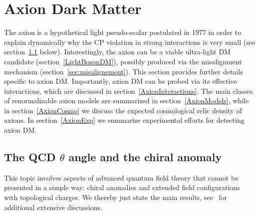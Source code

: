 \section{Axion Dark Matter}
\label{axion}
The axion is a hypothetical light pseudo-scalar postulated in 1977 in order to explain dynamically why the CP violation
in strong interactions is very small (see section~\ref{AxionQCD} below).
Interestingly, the axion can be a viable ultra-light  DM candidate (section~\ref{LightBosonDM}),
possibly produced via the misalignment mechanism (section~\ref{sec:misalignement}). This section provides further details specific to axion DM.
Importantly, axion DM can be probed via its effective interactions, which are discussed in section~\ref{AxionInteractions}.
The main classes of renormalizable axion models are summarized in section~\ref{AxionModels}, while
in section~\ref{AxionCosmo} we discuss the expected cosmological relic density of axions.
In section~\ref{AxionExp} we summarize experimental efforts for detecting axion DM.





\subsection{The QCD $\theta$ angle and the chiral anomaly}\label{AxionQCD}
This topic involves aspects of advanced quantum field theory
that cannot be presented in a simple way: chiral anomalies and
extended field configurations with topological charges.
We thereby just state the main results, see~\cite{axionmodels,axionreviews} for additional extensive discussions.

